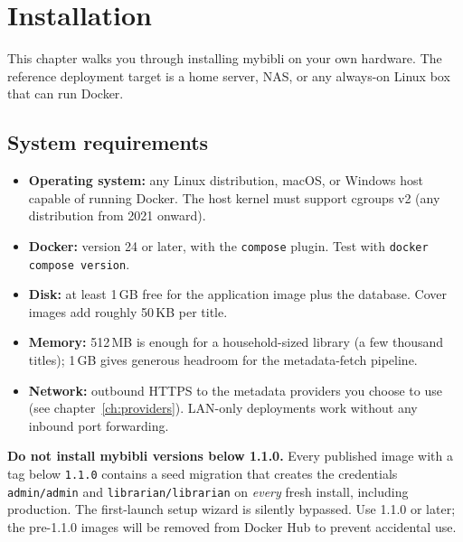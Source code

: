\chapter{Installation}
\label{ch:installation}

This chapter walks you through installing mybibli
on your own hardware. The reference deployment target is a home
server, NAS, or any always-on Linux box that can run Docker.

\section{System requirements}

\begin{itemize}
  \item \textbf{Operating system:} any Linux distribution, macOS, or
        Windows host capable of running Docker. The host kernel must
        support cgroups v2 (any distribution from 2021 onward).
  \item \textbf{Docker:} version 24 or later, with the \texttt{compose}
        plugin. Test with \texttt{docker compose version}.
  \item \textbf{Disk:} at least 1\,GB free for the application image
        plus the database. Cover images add roughly 50\,KB per title.
  \item \textbf{Memory:} 512\,MB is enough for a household-sized
        library (a few thousand titles); 1\,GB gives generous
        headroom for the metadata-fetch pipeline.
  \item \textbf{Network:} outbound HTTPS to the metadata
        providers you choose to use
        (see chapter~\ref{ch:providers}). LAN-only deployments work
        without any inbound port forwarding.
\end{itemize}

\begin{warning}
\textbf{Do not install mybibli versions below 1.1.0.}
Every published image with a tag below \texttt{1.1.0} contains a seed
migration that creates the credentials \texttt{admin/admin} and
\texttt{librarian/librarian} on \emph{every} fresh install, including
production. The first-launch setup wizard is silently bypassed. Use
1.1.0 or later; the pre-1.1.0 images will be removed from Docker Hub
to prevent accidental use.
\end{warning}

